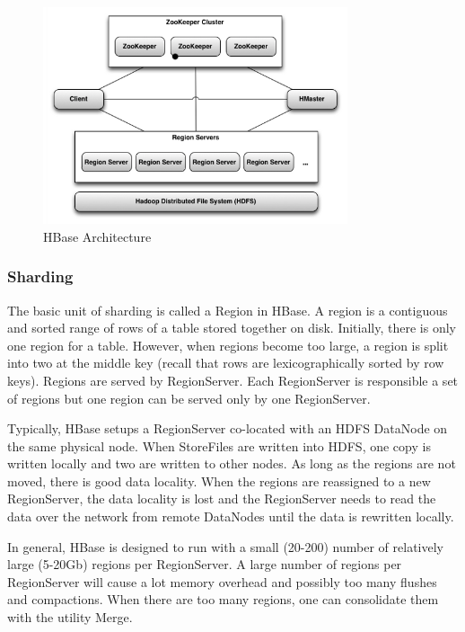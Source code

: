 \documentclass[11pt]{book}
\begin{document}
\begin{figure}[t]
\includegraphics[width=0.8\textwidth]{images/hbase-architecture.png}
\centering
\caption{HBase Architecture}
\end{figure}

\subsubsection{Sharding}

The basic unit of sharding is called a Region in HBase. A region is a contiguous and sorted range of rows of a table stored together on disk. Initially, there is only one region for a table. However, when regions become too large, a region is split into two at the middle key (recall that rows are lexicographically sorted by row keys). Regions are served by RegionServer. Each RegionServer is responsible a set of regions but one region can be served only by one RegionServer.

Typically, HBase setups a RegionServer co-located with an HDFS DataNode on the same physical node. When StoreFiles are written into HDFS, one copy is written locally and two are written to other nodes. As long as the regions are not moved, there is good data locality. When the regions are reassigned to a new RegionServer, the data locality is lost and the RegionServer needs to read the data over the network from remote DataNodes until the data is rewritten locally.

In general, HBase is designed to run with a small (20-200) number of relatively large (5-20Gb) regions per RegionServer. A large number of regions per RegionServer will cause a lot memory overhead and possibly too many flushes and compactions. When there are too many regions, one can consolidate them with the utility Merge.
\end{document}
